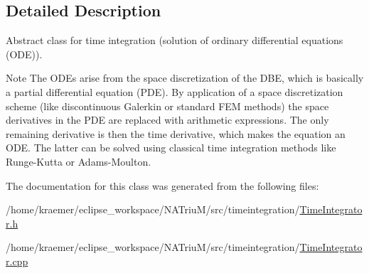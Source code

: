 \subsection{\-Detailed \-Description}
\-Abstract class for time integration (solution of ordinary differential equations (\-O\-D\-E)). 

\begin{DoxyNote}{\-Note}
\-The \-O\-D\-Es arise from the space discretization of the \-D\-B\-E, which is basically a partial differential equation (\-P\-D\-E). \-By application of a space discretization scheme (like discontinuous \-Galerkin or standard \-F\-E\-M methods) the space derivatives in the \-P\-D\-E are replaced with arithmetic expressions. \-The only remaining derivative is then the time derivative, which makes the equation an \-O\-D\-E. \-The latter can be solved using classical time integration methods like \-Runge-\/\-Kutta or \-Adams-\/\-Moulton. 
\end{DoxyNote}


\-The documentation for this class was generated from the following files\-:\begin{DoxyCompactItemize}
\item 
/home/kraemer/eclipse\-\_\-workspace/\-N\-A\-Triu\-M/src/timeintegration/\hyperlink{TimeIntegrator_8h}{\-Time\-Integrator.\-h}\item 
/home/kraemer/eclipse\-\_\-workspace/\-N\-A\-Triu\-M/src/timeintegration/\hyperlink{TimeIntegrator_8cpp}{\-Time\-Integrator.\-cpp}\end{DoxyCompactItemize}
